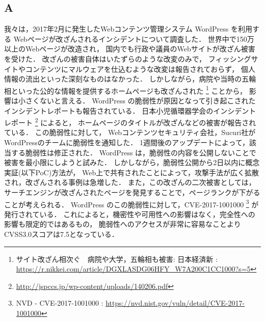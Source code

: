 \documentclass[uplatex]{jsarticle}
\begin{document}
\subsection*{A}
我々は，2017年2月に発生したWebコンテンツ管理システム WordPress を利用する
Webページが改ざんされるインシデントについて調査した．
世界中で150万以上のWebページが改造され，
国内でも行政や議員のWebサイトが改ざん被害を受けた．
改ざんの被害自体はいたずらのような改変のみで，
フィッシングサイトやコンテンツにマルウェアを仕込むような改変は報告されておらず，
個人情報の流出といった深刻なものはなかった．
しかしながら，病院や当時の五輪相といった公的な情報を提供するホームページも改ざんされた
\footnote{
    サイト改ざん相次ぐ　病院や大学，五輪相も被害: 日本経済新
    : \url{https://r.nikkei.com/article/DGXLASDG06HFY_W7A200C1CC1000?s=5}
}
ことから，
影響は小さくないと言える．
WordPress の脆弱性が原因となって引き起こされたインシデントレポートも報告されている．
日本小児循環器学会のインシデントレポート
\footnote{\url{http://jspccs.jp/wp-content/uploads/140206.pdf}}
によると，
ホームページのタイトルが改ざんなどの被害が報告されている．
この脆弱性に対して，
Webコンテンツセキュリティ会社，Sucuri社がWordPressのチームに脆弱性を通知した．
1週間後のアップデートによって，該当する脆弱性は修正された．
WordPress は，脆弱性の内容を公開しないことで被害を最小限にしようと試みた．
しかしながら，脆弱性公開から2日以内に概念実証(以下PoC)方法が，
Web上で共有されたことによって，攻撃手法が広く拡散され，改ざんされる事例は急増した．
また，この改ざんの二次被害としては，
サーチエンジンが改ざんされたページを発見することで，ページランクが下がることが考えられる．
WordPress のこの脆弱性に対して，CVE-2017-1001000
\footnote{
    NVD - CVE-2017-1001000
    : \url{https://nvd.nist.gov/vuln/detail/CVE-2017-1001000}
}
が発行されている．
これによると，機密性や可用性への影響はなく，完全性への影響も限定的ではあるもの，
脆弱性へのアクセスが非常に容易なことよりCVSS3.0スコアは7.5となっている．
\end{document}

